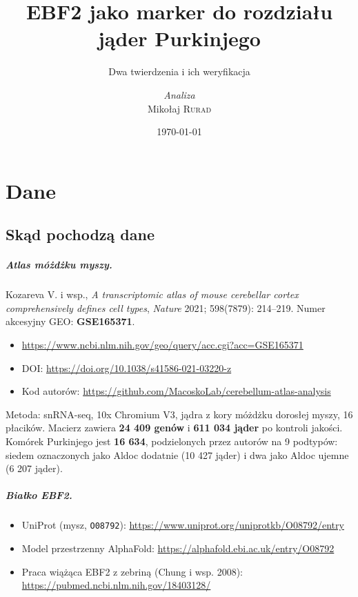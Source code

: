 \documentclass[a4paper,11pt]{report}
\institute{Instytut Chemii Bioorganicznej PAN}
\title{EBF2 jako marker do rozdziału jąder Purkinjego}
\subtitle{Dwa twierdzenia i ich weryfikacja}
\author{\textit{Analiza}\\Mikołaj \textsc{Rurad}}
\date{\today}
\begin{document}
\maketitle

\clearpage
{}
\tableofcontents
\clearpage
{}

\chapter{Dane}

\section{Skąd pochodzą dane}

\paragraph{Atlas móżdżku myszy.}
Kozareva V. i wsp., \textit{A transcriptomic atlas of mouse cerebellar cortex
comprehensively defines cell types}, \textit{Nature} 2021; 598(7879): 214--219.
Numer akcesyjny GEO: \textbf{GSE165371}.

\begin{itemize}
    \item \url{https://www.ncbi.nlm.nih.gov/geo/query/acc.cgi?acc=GSE165371}
    \item DOI: \url{https://doi.org/10.1038/s41586-021-03220-z}
    \item Kod autorów: \url{https://github.com/MacoskoLab/cerebellum-atlas-analysis}
\end{itemize}

Metoda: snRNA-seq, 10x Chromium V3, jądra z kory móżdżku dorosłej myszy,
16 płacików. Macierz zawiera \textbf{24 409 genów} i \textbf{611 034 jąder}
po kontroli jakości. Komórek Purkinjego jest \textbf{16 634}, podzielonych przez
autorów na 9 podtypów: siedem oznaczonych jako Aldoc dodatnie (10 427 jąder)
i dwa jako Aldoc ujemne (6 207 jąder).

\paragraph{Białko EBF2.}
\begin{itemize}
    \item UniProt (mysz, \texttt{O08792}): \url{https://www.uniprot.org/uniprotkb/O08792/entry}
    \item Model przestrzenny AlphaFold: \url{https://alphafold.ebi.ac.uk/entry/O08792}
    \item Praca wiążąca EBF2 z zebriną (Chung i wsp. 2008): \url{https://pubmed.ncbi.nlm.nih.gov/18403128/}
\end{itemize}
\end{document}
